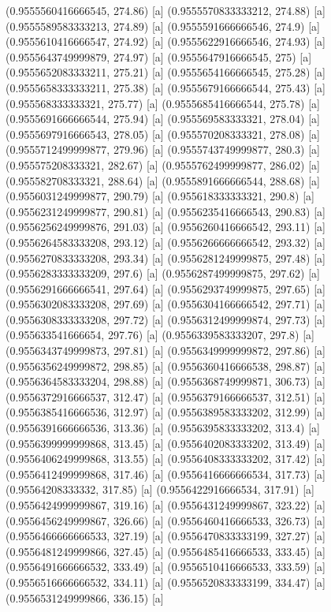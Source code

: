 {{{(0.9555560416666545, 274.86) [a] 
(0.9555570833333212, 274.88) [a] 
(0.9555589583333213, 274.89) [a] 
(0.9555591666666546, 274.9) [a] 
(0.9555610416666547, 274.92) [a] 
(0.9555622916666546, 274.93) [a] 
(0.9555643749999879, 274.97) [a] 
(0.9555647916666545, 275) [a] 
(0.9555652083333211, 275.21) [a] 
(0.9555654166666545, 275.28) [a] 
(0.9555658333333211, 275.38) [a] 
(0.9555679166666544, 275.43) [a] 
(0.955568333333321, 275.77) [a] 
(0.9555685416666544, 275.78) [a] 
(0.9555691666666544, 275.94) [a] 
(0.955569583333321, 278.04) [a] 
(0.9555697916666543, 278.05) [a] 
(0.955570208333321, 278.08) [a] 
(0.9555712499999877, 279.96) [a] 
(0.9555743749999877, 280.3) [a] 
(0.955575208333321, 282.67) [a] 
(0.9555762499999877, 286.02) [a] 
(0.955582708333321, 288.64) [a] 
(0.9555891666666544, 288.68) [a] 
(0.9556031249999877, 290.79) [a] 
(0.955618333333321, 290.8) [a] 
(0.9556231249999877, 290.81) [a] 
(0.9556235416666543, 290.83) [a] 
(0.9556256249999876, 291.03) [a] 
(0.9556260416666542, 293.11) [a] 
(0.9556264583333208, 293.12) [a] 
(0.9556266666666542, 293.32) [a] 
(0.9556270833333208, 293.34) [a] 
(0.9556281249999875, 297.48) [a] 
(0.9556283333333209, 297.6) [a] 
(0.9556287499999875, 297.62) [a] 
(0.9556291666666541, 297.64) [a] 
(0.9556293749999875, 297.65) [a] 
(0.9556302083333208, 297.69) [a] 
(0.9556304166666542, 297.71) [a] 
(0.9556308333333208, 297.72) [a] 
(0.9556312499999874, 297.73) [a] 
(0.955633541666654, 297.76) [a] 
(0.9556339583333207, 297.8) [a] 
(0.9556343749999873, 297.81) [a] 
(0.9556349999999872, 297.86) [a] 
(0.9556356249999872, 298.85) [a] 
(0.9556360416666538, 298.87) [a] 
(0.9556364583333204, 298.88) [a] 
(0.9556368749999871, 306.73) [a] 
(0.9556372916666537, 312.47) [a] 
(0.9556379166666537, 312.51) [a] 
(0.9556385416666536, 312.97) [a] 
(0.9556389583333202, 312.99) [a] 
(0.9556391666666536, 313.36) [a] 
(0.9556395833333202, 313.4) [a] 
(0.9556399999999868, 313.45) [a] 
(0.9556402083333202, 313.49) [a] 
(0.9556406249999868, 313.55) [a] 
(0.9556408333333202, 317.42) [a] 
(0.9556412499999868, 317.46) [a] 
(0.9556416666666534, 317.73) [a] 
(0.95564208333332, 317.85) [a] 
(0.9556422916666534, 317.91) [a] 
(0.9556424999999867, 319.16) [a] 
(0.9556431249999867, 323.22) [a] 
(0.9556456249999867, 326.66) [a] 
(0.9556460416666533, 326.73) [a] 
(0.9556466666666533, 327.19) [a] 
(0.9556470833333199, 327.27) [a] 
(0.9556481249999866, 327.45) [a] 
(0.9556485416666533, 333.45) [a] 
(0.9556491666666532, 333.49) [a] 
(0.9556510416666533, 333.59) [a] 
(0.9556516666666532, 334.11) [a] 
(0.9556520833333199, 334.47) [a] 
(0.9556531249999866, 336.15) [a] 
}}}
